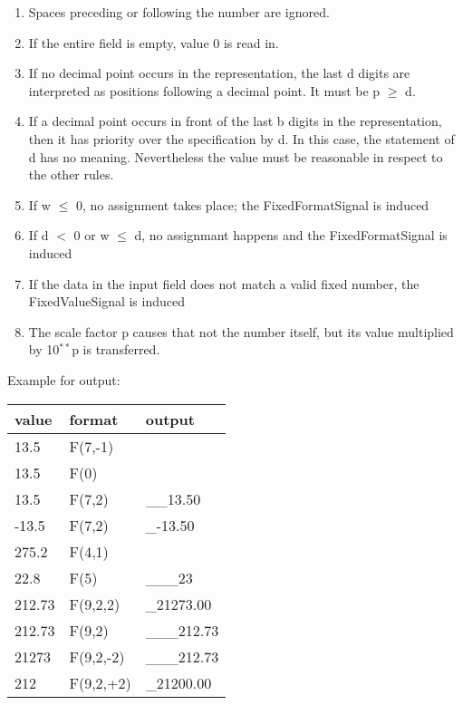 \begin{added}
\begin{enumerate}
\begin{enumerate}
\item Spaces preceding or following the number are ignored.
\item If the entire field is empty, value 0 is read in.
\item If no decimal point occurs in the representation, the last d
digits are interpreted as positions following a decimal point. It must
be p $\geq$ d.
\item If a decimal point occurs in front of the last b digits in the
representation, then it has priority over the specification by d. In
this case, the statement of d has no meaning. Nevertheless the value must
be reasonable in respect to the other rules. 
\item If w $\leq$ 0, no assignment takes place;
    the FixedFormatSignal is induced
\item If d $<$ 0 or w $\leq$ d, no assignmant happens and 
    the FixedFormatSignal is induced
\item If the data in the input field does not match a valid fixed 
   number, the FixedValueSignal is induced
\item The scale factor p causes that not the number itself, but its
value multiplied by 10$^{**}$p is transferred.
\end{enumerate}
\end{enumerate}

Example for output:

\begin{tabular}{lll}
value  & format   & output \\ \hline
13.5   & F(7,-1)   &  \x \x {\em FixedFormatSignal!}  \\
13.5   & F(0)   &  \x \x {\em FixedFormatSignal!}  \\
13.5   & F(7,2)   & \_\_13.50  \\
-13.5   & F(7,2)   & \_-13.50  \\
275.2  & F(4,1)   &  \x \x {\em FixedValueSignal!} \\
22.8   & F(5)     & \_\_\_23 \\
212.73 & F(9,2,2) & \_21273.00 \\
212.73 & F(9,2)   & \_\_\_212.73 \\
21273 & F(9,2,-2)   & \_\_\_212.73 \\
212 & F(9,2,+2)   & \_21200.00 \\
\end{tabular}
\end{added}

